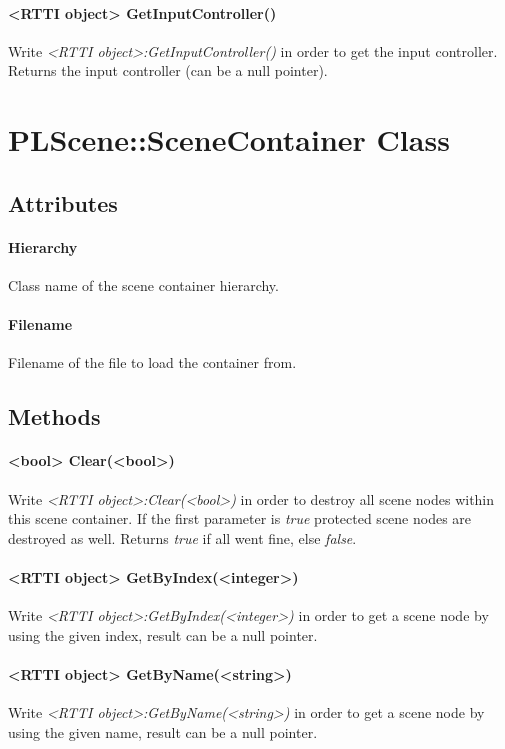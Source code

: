 \paragraph{<RTTI object> GetInputController()}
Write \emph{<RTTI object>:GetInputController()} in order to get the input controller. Returns the input controller (can be a null pointer).




\section{PLScene::SceneContainer Class}


\subsection{Attributes}

\paragraph{Hierarchy}
Class name of the scene container hierarchy.

\paragraph{Filename}
Filename of the file to load the container from.


\subsection{Methods}

\paragraph{<bool> Clear(<bool>)}
Write \emph{<RTTI object>:Clear(<bool>)} in order to destroy all scene nodes within this scene container. If the first parameter is \emph{true} protected scene nodes are destroyed as well. Returns \emph{true} if all went fine, else \emph{false}.

\paragraph{<RTTI object> GetByIndex(<integer>)}
Write \emph{<RTTI object>:GetByIndex(<integer>)} in order to get a scene node by using the given index, result can be a null pointer.

\paragraph{<RTTI object> GetByName(<string>)}
Write \emph{<RTTI object>:GetByName(<string>)} in order to get a scene node by using the given name, result can be a null pointer.

